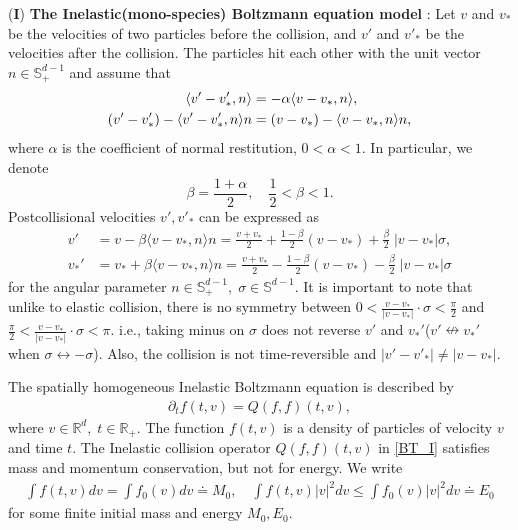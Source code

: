 \documentclass[reqno,10pt]{amsart}
\renewcommand{\S}{\mathbb{S}}
\newcommand{\Be}{\begin{equation}}
\newcommand{\Ee}{\end{equation}}
\numberwithin{equation}{section}
\begin{document}
\noindent($\mathbf{I}$) {\bf The Inelastic(mono-species) Boltzmann equation model} : 
Let $v$ and $v_*$ be the velocities of two particles before the collision, and $v'$ and $v'_*$ be the velocities after the collision. The particles hit each other with the unit vector ${n}\in \S^{d-1}_{+}$ and assume that
\begin{align} \label{alpha}
\langle v'-v_*',n \rangle &= -\alpha \langle v-v_*,n \rangle, \notag \\
(v'-v'_*)-\langle v'-v_*',n \rangle {n} &= (v-v_*)-\langle v-v_*,n \rangle {n},
\end{align}
where $\alpha$ is the coefficient of normal restitution, $0<\alpha<1$. In particular, we denote 
\Be \label{def beta}
	\beta = \frac{1+\alpha}{2},\quad \frac{1}{2} < \beta < 1. 
\Ee 
Postcollisional velocities $v',v'_*$ can be expressed as
\begin{equation} \label{v'_I}
\begin{split}
    v' &= v-\beta\langle v-v_*,n \rangle {n}
    =\frac{v+v_*}{2}+\frac{1-\beta}{2}(v-v_*)+\frac{\beta}{2}\;|v-v_*|{\sigma},  \\
     v_*' &= v_*+\beta\langle v-v_*,n \rangle {n}=\frac{v+v_*}{2}-\frac{1-\beta}{2}(v-v_*)-\frac{\beta}{2}\;|v-v_*|{\sigma}
\end{split}
\end{equation}
for the angular parameter ${n} \in \mathbb{S}^{d-1}_{+}, \; {\sigma} \in \mathbb{S}^{d-1}.$
It is important to note that unlike to elastic collision, there is no symmetry between $0 < \frac{v-v_*}{|v-v_*|} \cdot \sigma < \frac{\pi}{2}$ and $\frac{\pi}{2} < \frac{v-v_*}{|v-v_*|} \cdot \sigma < \pi$. i.e., taking minus on ${\sigma}$ does not reverse $v'$ and $v_*'$($v' \nleftrightarrow v_*'$ when ${\sigma} \leftrightarrow -{\sigma}$). Also, the collision is not time-reversible and $|v'-v'_*| \neq|v-v_*|$.
\vspace{3mm}

\noindent The spatially homogeneous Inelastic Boltzmann equation is described by 
\begin{align} \label{BT_I}
    \partial_t f (t,v) = Q(f,f) (t,v),
\end{align} 
where $v \in \mathbb{R}^d, \; t \in \mathbb{R}_{+}.$ The function $f(t,v)$ is a density of particles of velocity $v$ and time $t$. The Inelastic collision operator $Q(f,f) (t,v)$ in \eqref{BT_I} satisfies mass and momentum conservation, but not for energy. 
We write 
\begin{align} \label{hydro_I}
    \int f(t,v) dv = \int f_0(v) dv \doteq M_0,\quad \int f(t,v)|v|^2 dv \leq \int f_0(v)|v|^2 dv \doteq E_0
\end{align} 
for some finite initial mass and energy $M_0, E_0$. \vspace{3mm}
\end{document}
